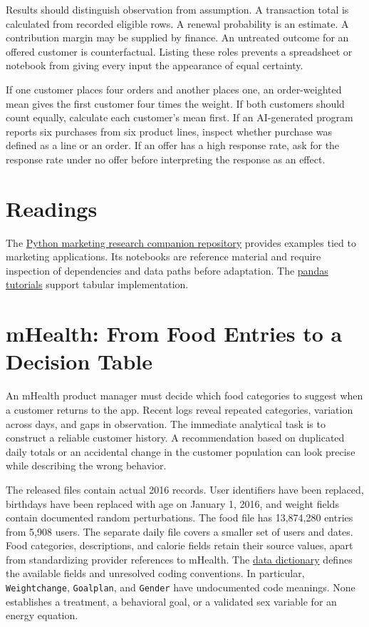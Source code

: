 Results should distinguish observation from assumption. A transaction
total is calculated from recorded eligible rows. A renewal probability
is an estimate. A contribution margin may be supplied by finance. An
untreated outcome for an offered customer is counterfactual. Listing
these roles prevents a spreadsheet or notebook from giving every input
the appearance of equal certainty.

If one customer places four orders and another places one, an
order-weighted mean gives the first customer four times the weight. If
both customers should count equally, calculate each customer's mean
first. If an AI-generated program reports six purchases from six product
lines, inspect whether purchase was defined as a line or an order. If an
offer has a high response rate, ask for the response rate under no offer
before interpreting the response as an effect.

\hypertarget{M01-readings}{%
\section{Readings}\label{M01-readings}}

\noindent The
\href{https://github.com/python-marketing-research/python-marketing-research-1ed}{Python
marketing research companion repository} provides examples tied to
marketing applications. Its notebooks are reference material and require
inspection of dependencies and data paths before adaptation. The
\href{https://pandas.pydata.org/docs/getting_started/intro_tutorials/}{pandas
tutorials} support tabular implementation.

\hypertarget{M01-mhealth-from-food-entries-to-a-decision-table}{%
\section{mHealth: From Food Entries to a Decision
Table}\label{M01-mhealth-from-food-entries-to-a-decision-table}}

\noindent An mHealth product manager must decide which food categories to suggest
when a customer returns to the app. Recent logs reveal repeated
categories, variation across days, and gaps in observation. The
immediate analytical task is to construct a reliable customer history. A
recommendation based on duplicated daily totals or an accidental change
in the customer population can look precise while describing the wrong
behavior.

The released files contain actual 2016 records. User identifiers have
been replaced, birthdays have been replaced with age on January 1, 2016,
and weight fields contain documented random perturbations. The food file
has 13,874,280 entries from 5,908 users. The separate daily file covers
a smaller set of users and dates. Food categories, descriptions, and
calorie fields retain their source values, apart from standardizing
provider references to mHealth. The
\href{../03_Data_and_Code/mHealth/DATA_DICTIONARY.md}{data dictionary}
defines the available fields and unresolved coding conventions. In
particular, \texttt{Weightchange}, \texttt{Goalplan}, and
\texttt{Gender} have undocumented code meanings. None establishes a
treatment, a behavioral goal, or a validated sex variable for an energy
equation.

